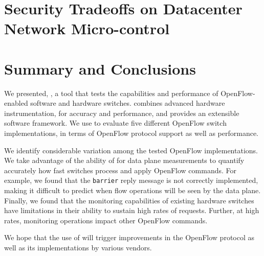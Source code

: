 \section{Security Tradeoffs on Datacenter Network Micro-control} \label{sec:rdsf-eval}

\section{Summary and Conclusions}\label{sec:conclusion}
We presented, \oflops, a tool that tests the capabilities and performance of 
OpenFlow-enabled software and hardware switches. \oflops combines advanced 
hardware instrumentation, for accuracy and performance, and provides an extensible 
software framework. We use \oflops to evaluate five different OpenFlow switch 
implementations, in terms of OpenFlow protocol support as well as performance.

We identify considerable variation among the tested OpenFlow implementations.
We take advantage of the ability of \oflops for data plane measurements to
quantify accurately how fast switches process and apply OpenFlow commands.
For example, we found that the \texttt{barrier} reply message is not correctly implemented,
making it difficult to predict when flow operations will be seen by the data plane.
Finally, we found that the monitoring capabilities of existing hardware switches 
have limitations in their ability to sustain high rates of requests. Further, at high 
rates, monitoring operations impact other OpenFlow commands.

We hope that the use of \oflops will trigger improvements in the
OpenFlow protocol as well as its implementations by various vendors.




